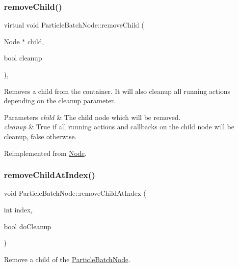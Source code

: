 \subsubsection{\texorpdfstring{remove\+Child()}{removeChild()}\hspace{0.1cm}{\footnotesize\ttfamily [2/2]}}
{\footnotesize\ttfamily virtual void Particle\+Batch\+Node\+::remove\+Child (\begin{DoxyParamCaption}\item[{\hyperlink{classNode}{Node} $\ast$}]{child,  }\item[{bool}]{cleanup }\end{DoxyParamCaption})\hspace{0.3cm}{\ttfamily [override]}, {\ttfamily [virtual]}}

Removes a child from the container. It will also cleanup all running actions depending on the cleanup parameter.


\begin{DoxyParams}{Parameters}
{\em child} & The child node which will be removed. \\
\hline
{\em cleanup} & True if all running actions and callbacks on the child node will be cleanup, false otherwise. \\
\hline
\end{DoxyParams}


Reimplemented from \hyperlink{classNode_a872d4a7d389b26b0c6ad7ed99c8b1b65}{Node}.

\mbox{\label{classParticleBatchNode_a7f46acad56bfa65d5903121072f22a1a}} 
\subsubsection{\texorpdfstring{remove\+Child\+At\+Index()}{removeChildAtIndex()}\hspace{0.1cm}{\footnotesize\ttfamily [1/2]}}
{\footnotesize\ttfamily void Particle\+Batch\+Node\+::remove\+Child\+At\+Index (\begin{DoxyParamCaption}\item[{int}]{index,  }\item[{bool}]{do\+Cleanup }\end{DoxyParamCaption})}

Remove a child of the \hyperlink{classParticleBatchNode}{Particle\+Batch\+Node}.



